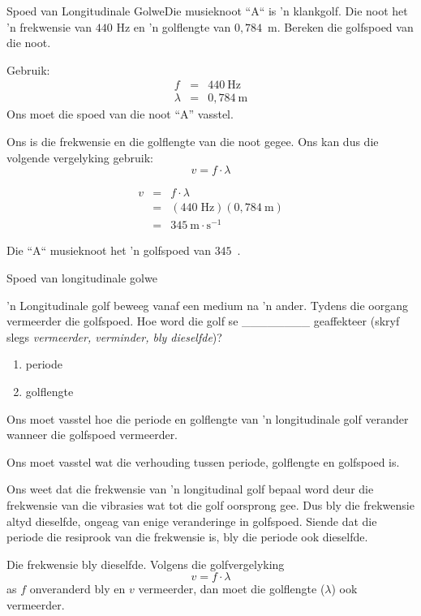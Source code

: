 \begin{wex}
{Spoed van Longitudinale Golwe}{Die musieknoot ``A`` is 'n klankgolf. Die noot het 'n frekwensie van $440$ Hz en 'n golflengte van $0,784$~m. Bereken die golfspoed van die noot.}{
Gebruik:
\begin{eqnarray*}
f &=& 440 \ \text{Hz} \\
\lambda &=& 0,784\ \text{m}
\end{eqnarray*}
Ons moet die spoed van die noot ``A'' vasstel.

Ons is die frekwensie en die golflengte van die noot gegee. Ons kan dus die volgende vergelyking gebruik:
\begin{equation*}
v=f\cdot \lambda 
\end{equation*}

\begin{eqnarray*}
v&=&f\cdot \lambda\\
&=&(440\;\text{Hz})(0,784~\text{m})\\
&=&345~\text{m}\cdot\text{s}^{-1}
\end{eqnarray*}

Die ``A`` musieknoot het 'n golfspoed van $345$~\ms.
}
\end{wex}

\begin{wex}
{Spoed van longitudinale golwe}{'n Longitudinale golf beweeg vanaf een medium na 'n ander. Tydens die oorgang vermeerder die golfspoed. Hoe word die golf se ________ geaffekteer (skryf slegs \emph{vermeerder, verminder, bly dieselfde})?
\begin{enumerate}[noitemsep, label=\textbf{\arabic*}. ]\item periode
\item golflengte
\end{enumerate}
}{
Ons moet vasstel hoe die periode en golflengte van 'n longitudinale golf verander wanneer die golfspoed vermeerder.

Ons moet vasstel wat die verhouding tussen periode, golflengte en golfspoed is.

Ons weet dat die frekwensie van 'n longitudinal golf bepaal word deur die frekwensie van die vibrasies wat tot die golf oorsprong gee. Dus bly die frekwensie altyd dieselfde, ongeag van enige veranderinge in golfspoed. Siende dat die periode die resiprook van die frekwensie is, bly die periode ook dieselfde.

Die frekwensie bly dieselfde. Volgens die golfvergelyking
\begin{equation*}
v = f\cdot\lambda
\end{equation*}
as $f$ onveranderd bly en $v$ vermeerder, dan moet die golflengte ($\lambda$) ook vermeerder.
}
\end{wex}

